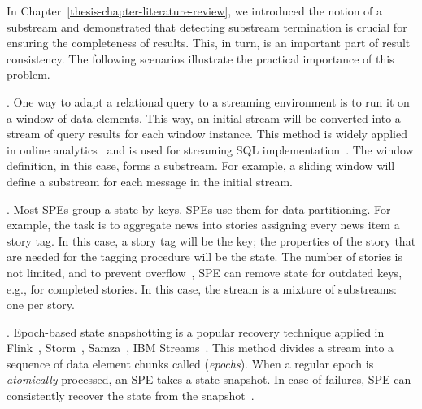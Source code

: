 
In Chapter~\ref{thesis-chapter-literature-review}, we introduced the notion of a substream and demonstrated that detecting substream termination is crucial for ensuring the completeness of results. This, in turn, is an important part of result consistency. The following scenarios illustrate the practical importance of this problem.

. One way to adapt a relational query to a streaming environment is to run it on a window of data elements. This way, an initial stream will be converted into a stream of query results for each window instance. This method is widely applied in online analytics~\cite{traub2018scotty} and is used for streaming SQL implementation~\cite{Begoli:2019:OSR:3299869.3314040}. The window definition, in this case, forms a substream. For example, a sliding window will define a substream for each message in the initial stream.

. Most SPEs group a state by keys. SPEs use them for data partitioning. For example, the task is to aggregate news into stories assigning every news item a story tag. In this case, a story tag will be the key; the properties of the story that are needed for the tagging procedure will be the state. The number of stories is not limited, and to prevent overflow~\cite{Tucker:2003:EPS:776752.776780}, SPE can remove state for outdated keys, e.g., for completed stories. In this case, the stream is a mixture of substreams: one per story.  

. Epoch-based state snapshotting is a popular recovery technique applied in Flink~\cite{Carbone:2017:SMA:3137765.3137777}, Storm~\cite{Toshniwal:2014:STO:2588555.2595641}, Samza~\cite{Noghabi:2017:SSS:3137765.3137770}, IBM Streams~\cite{jacques2016consistent}. This method divides a stream into a sequence of data element chunks called ({\em epochs}). When a regular epoch is {\em atomically} processed, an SPE takes a state snapshot. In case of failures, SPE can consistently recover the state from the snapshot~\cite{2015arXiv150608603C}. 

